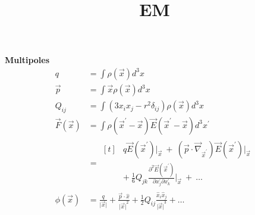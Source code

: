 \documentclass[12pt]{article}
\title{\vspace{-2em}EM}
\date{}
\begin{document}
\maketitle

\vspace{-4em}
\begin{multicols}{3}

  \textbf{Multipoles}
  \begin{align}
    q &= \int \rho(\vec{x}) d^3x\\
    \vec{p} &= \int \vec{x} \rho(\vec{x}) d^3x\\
    Q_{ij} &= \int (3x_ix_j-r^2\delta_{ij})\rho(\vec{x})d^3x\\ %
    \vec{F}(\vec{x}) &= \int \rho(\vec{x}^{\prime} - \vec{x}) \vec{E}(\vec{x}^{\prime} - \vec{x}) d^3x^{\prime}\\
    &= \begin{aligned}[t]
      &q\vec{E}(\vec{x}^{\prime})\lvert_{\vec{x}} \ + \ (\vec{p} \cdot \vec{\nabla}_{\vec{x}^{\prime}}) \vec{E}(\vec{x}^{\prime}) \lvert_{\vec{x}}\\
      &+ \  \frac{1}{6} Q_{jk} \frac{\partial^2 \vec{E}(\vec{x}^{\prime})}{\partial x^{\prime}_j \partial x^{\prime}_k} \lvert_{\vec{x}} \ + \ \dots
    \end{aligned}\\
    \phi(\vec{x}) &= \frac{q}{\lvert \vec{x} \rvert} + \frac{\vec{p} \cdot \hat{x}}{{\lvert \vec{x} \rvert}^2} + \frac{1}{2} Q_{ij} \frac{\hat{x}_i \hat{x}_j}{{\lvert \vec{x} \rvert}^3} + \dots
  \end{align}
\end{multicols}
\end{document}
